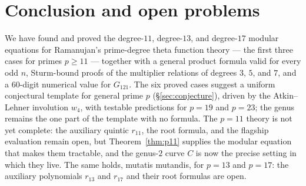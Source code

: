 \documentclass[11pt]{amsart}
\theoremstyle{plain}
\theoremstyle{definition}
\theoremstyle{remark}
\begin{document}
\section{Conclusion and open problems}
\label{sec:conclusion}

We have found and proved the degree-$11$, degree-$13$, and degree-$17$ modular
equations for Ramanujan's prime-degree theta function theory --- the first three
cases for primes $p \geq 11$ ---
together with a general product formula valid for every odd $n$, Sturm-bound proofs
of the multiplier relations of degrees $3$, $5$, and $7$, and a 60-digit numerical
value for $G_{121}$. The six proved cases suggest a uniform conjectural template
for general prime $p$ (\S\ref{sec:conjecture}), driven by the Atkin--Lehner
involution $w_4$, with testable predictions for $p = 19$ and $p = 23$; the genus
remains the one part of the template with no formula. The $p=11$ theory is not
yet complete: the auxiliary quintic
$r_{11}$, the root formula, and the flagship evaluation remain open, but
Theorem~\ref{thm:p11} supplies the modular equation that makes them tractable, and
the genus-$2$ curve $C$ is now the precise setting in which they live. The same
holds, mutatis mutandis, for $p = 13$ and $p = 17$: the auxiliary polynomials
$r_{13}$ and $r_{17}$ and their root formulas are open.
\end{document}
